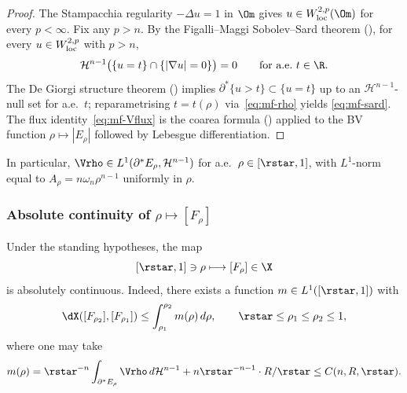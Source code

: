 \begin{proof}
The Stampacchia regularity $-\Delta u=1$ in $\Om$ gives $u\in W^{2,p}_{\rm
loc}(\Om)$ for every $p<\infty$. Fix any $p>n$. By the
Figalli--Maggi Sobolev--Sard theorem
(\cite[Appendix~A, Theorem~A.1]{FigalliMaggi2011}), for every $u\in
W^{2,p}_{\rm loc}$ with $p>n$,
\[
   \mathcal H^{n-1}\bigl(\{u=t\}\cap\{|\nabla u|=0\}\bigr)=0
   \qquad\text{for a.e.~}t\in\R.
\]
The De Giorgi structure theorem (\cite[\S~15]{Maggi2012}) implies
$\partial^*\{u>t\}\subset\{u=t\}$ up to an $\mathcal H^{n-1}$-null set for
a.e.~$t$; reparametrising $t=t(\rho)$ via~\eqref{eq:mf-rho} yields
\eqref{eq:mf-sard}. The flux identity~\eqref{eq:mf-Vflux} is the coarea
formula (\cite[Thm.~13.1]{Maggi2012}) applied to the BV function
$\rho\mapsto|E_\rho|$ followed by Lebesgue differentiation.
\end{proof}

In particular, $\Vrho\in L^1(\partial^*E_\rho,\mathcal H^{n-1})$ for
a.e.~$\rho\in[\rstar,1]$, with $L^1$-norm equal to $A_\rho=n\omega_n
\rho^{n-1}$ uniformly in $\rho$.

\subsubsection{Absolute continuity of $\rho\mapsto[F_\rho]$}
\label{sec:metric-AC}

\begin{theorem}\label{thm:mf-AC}\label{thm:metric:AC}
Under the standing hypotheses, the map
\[
   [\rstar,1]\ni\rho\longmapsto[F_\rho]\in\X
\]
is absolutely continuous. Indeed, there exists a function
$m\in L^1([\rstar,1])$ with
\begin{equation}\label{eq:mf-AC-m}
   \dX([F_{\rho_2}],[F_{\rho_1}])\le\int_{\rho_1}^{\rho_2}m(\rho)\,d\rho,
   \qquad \rstar\le\rho_1\le\rho_2\le 1,
\end{equation}
where one may take
\begin{equation}\label{eq:mf-m-def}
   m(\rho)=\rstar^{-n}\int_{\partial^*E_\rho}\Vrho\,d\mathcal H^{n-1}
            +n\rstar^{-n-1}\cdot R/\rstar
   \le C(n,R,\rstar).
\end{equation}
\end{theorem}

